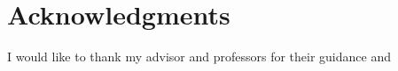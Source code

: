 \documentclass{umassthesis}          %
\begin{document}

%
%
%

\chapter{Acknowledgments}             %
  I would like to thank my advisor and professors for their guidance and 
\end{document}
